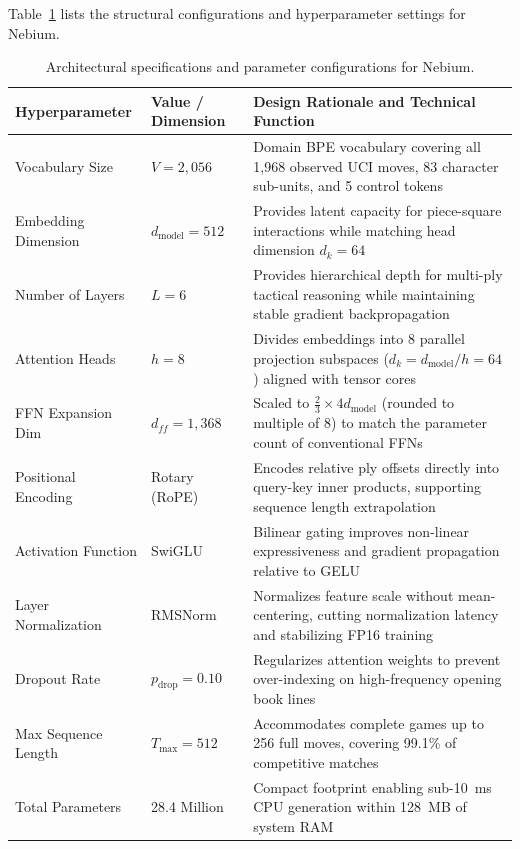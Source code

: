 Table~\ref{tab:model_hyperparams} lists the structural configurations and hyperparameter settings for Nebium.

\begin{table}[H]
\centering
\small
\caption{Architectural specifications and parameter configurations for Nebium.}
\label{tab:model_hyperparams}
\begin{tabularx}{\linewidth}{l l X}
\toprule
\textbf{Hyperparameter} & \textbf{Value / Dimension} & \textbf{Design Rationale and Technical Function} \\
\midrule
Vocabulary Size & $V = 2,056$ & Domain BPE vocabulary covering all 1,968 observed UCI moves, 83 character sub-units, and 5 control tokens \\
Embedding Dimension & $d_{\text{model}} = 512$ & Provides latent capacity for piece-square interactions while matching head dimension $d_k = 64$ \\
Number of Layers & $L = 6$ & Provides hierarchical depth for multi-ply tactical reasoning while maintaining stable gradient backpropagation \\
Attention Heads & $h = 8$ & Divides embeddings into 8 parallel projection subspaces ($d_k = d_{\text{model}}/h = 64$) aligned with tensor cores \\
FFN Expansion Dim & $d_{ff} = 1,368$ & Scaled to $\frac{2}{3} \times 4 d_{\text{model}}$ (rounded to multiple of 8) to match the parameter count of conventional FFNs \\
Positional Encoding & Rotary (RoPE) & Encodes relative ply offsets directly into query-key inner products, supporting sequence length extrapolation \\
Activation Function & SwiGLU & Bilinear gating improves non-linear expressiveness and gradient propagation relative to GELU \\
Layer Normalization & RMSNorm & Normalizes feature scale without mean-centering, cutting normalization latency and stabilizing FP16 training \\
Dropout Rate & $p_{\text{drop}} = 0.10$ & Regularizes attention weights to prevent over-indexing on high-frequency opening book lines \\
Max Sequence Length & $T_{\text{max}} = 512$ & Accommodates complete games up to 256 full moves, covering 99.1\% of competitive matches \\
Total Parameters & 28.4 Million & Compact footprint enabling sub-10~ms CPU generation within 128~MB of system RAM \\
\bottomrule
\end{tabularx}
\end{table}


